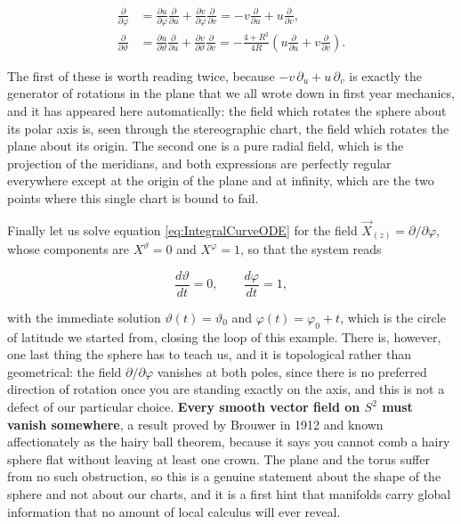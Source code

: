         \begin{align}
            \frac{\partial}{\partial \varphi} &= \frac{\partial u}{\partial \varphi}\frac{\partial}{\partial u} + \frac{\partial v}{\partial \varphi}\frac{\partial}{\partial v} = -v\frac{\partial}{\partial u} + u\frac{\partial}{\partial v},\\
            \frac{\partial}{\partial \vartheta} &= \frac{\partial u}{\partial \vartheta}\frac{\partial}{\partial u} + \frac{\partial v}{\partial \vartheta}\frac{\partial}{\partial v} = -\frac{4 + R^2}{4R}\left(u\frac{\partial}{\partial u} + v\frac{\partial}{\partial v}\right).
        \end{align}

        The first of these is worth reading twice, because $-v\,\partial_u + u\,\partial_v$ is exactly the generator of rotations in the plane that we all wrote down in first year mechanics, and it has appeared here automatically: the field which rotates the sphere about its polar axis is, seen through the stereographic chart, the field which rotates the plane about its origin. The second one is a pure radial field, which is the projection of the meridians, and both expressions are perfectly regular everywhere except at the origin of the plane and at infinity, which are the two points where this single chart is bound to fail.

        Finally let us solve equation \ref{eq:IntegralCurveODE} for the field $\Vec{X}_{(z)} = \partial/\partial\varphi$, whose components are $X^{\vartheta}=0$ and $X^{\varphi}=1$, so that the system reads

        \begin{equation}
            \frac{d\vartheta}{dt} = 0,\qquad \frac{d\varphi}{dt} = 1,
        \end{equation}

        with the immediate solution $\vartheta(t) = \vartheta_0$ and $\varphi(t) = \varphi_0 + t$, which is the circle of latitude we started from, closing the loop of this example. There is, however, one last thing the sphere has to teach us, and it is topological rather than geometrical: the field $\partial/\partial\varphi$ vanishes at both poles, since there is no preferred direction of rotation once you are standing exactly on the axis, and this is not a defect of our particular choice. \textbf{Every smooth vector field on $S^2$ must vanish somewhere}, a result proved by Brouwer in 1912 and known affectionately as the hairy ball theorem, because it says you cannot comb a hairy sphere flat without leaving at least one crown. The plane and the torus suffer from no such obstruction, so this is a genuine statement about the shape of the sphere and not about our charts, and it is a first hint that manifolds carry global information that no amount of local calculus will ever reveal.

